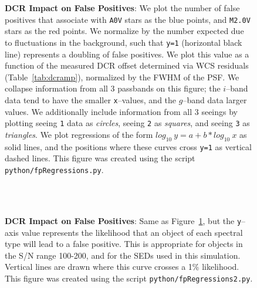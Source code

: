 \documentclass[prd, nofootinbib, floatfix, 11pt, tightenlines, times]{article}
\def\figdir{../figures}
\begin{document}
\begin{figure}[!ht]
  \centering
   \\
   \\
  \caption{{\bf DCR Impact on False Positives}: We plot the number of
    false positives that associate with {\tt A0V} stars as the blue
    points, and {\tt M2.0V} stars as the red points.  We normalize by
    the number expected due to fluctuations in the background, such
    that {\tt y=1} (horizontal black line) represents a doubling of
    false positives.  We plot this value as a function of the measured
    DCR offset determined via WCS residuals (Table~\ref{tab:dcramp}),
    normalized by the FWHM of the PSF.  We collapse information from
    all 3 passbands on this figure; the $i$--band data tend to have
    the smaller {\tt x}--values, and the $g$--band data larger values.
    We additionally include information from all 3 seeings by plotting
    seeing {\tt 1} data as {\it circles}, seeing {\tt 2} as {\it
      squares}, and seeing {\tt 3} as {\it triangles}.  We plot
    regressions of the form $log_{10}~y = a + b * log_{10}~x$ as solid
    lines, and the positions where these curves cross {\tt y=1} as
    vertical dashed lines.  This figure was created using the script
    {\tt python/fpRegressions.py}.}
  \label{fig:fpregress}
\end{figure}

\begin{figure}[!ht]
  \centering
   \\
   \\
  \caption{{\bf DCR Impact on False Positives}: Same as
    Figure~\ref{fig:fpregress}, but the {\tt y}--axis value represents
    the likelihood that an object of each spectral type will lead to a
    false positive.  This is appropriate for objects in the S/N range
    100-200, and for the SEDs used in this simulation.  Vertical lines
    are drawn where this curve crosses a 1\% likelihood.  This figure
    was created using the script {\tt python/fpRegressions2.py}.}
  \label{fig:fpregress2}
\end{figure}
\end{document}

